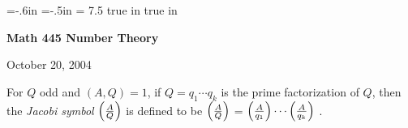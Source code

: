 \def\cmb{\MidnightBlue}	  %
\def\cnb{\NavyBlue}	  %
\def\crb{\RoyalBlue}	  %
\def\cce{\Cerulean}	  %
\def\ccy{\Cyan}		  %
\def\cpb{\ProcessBlue}	  %
\def\csb{\SkyBlue}	  %
\def\ctu{\Turquoise}	  %
\def\ctb{\TealBlue}	  %
\def\caq{\Aquamarine}	  %
\def\cbg{\BlueGreen}	  %
\def\cem{\Emerald}	  %
\def\cjg{\JungleGreen}	  %
\def\csg{\SeaGreen}	  %
\def\cgg{\Green}	  %
\def\cfg{\ForestGreen}	  %
\def\cpg{\PineGreen}	  %
\def\clg{\LimeGreen}	  %
\def\cyg{\YellowGreen}	  %
\def\cspg{\SpringGreen}	  %
\def\cog{\OliveGreen}	  %
\def\pars{\RawSienna}	  %
\def\cse{\Sepia}		  %
\def\cbr{\Brown}		  %
\def\cta{\Tan}		  %
\def\cgr{\Gray}		  %
\def\cbl{\Black}		  %
\def\cwh{\White}		  %


\voffset=-.6in
\hoffset=-.5in
\hsize = 7.5 true in
 true in


\overfullrule=0pt


\def\ctln{\centerline}
\def\u{\underbar}
\def\ssk{\smallskip}
\def\msk{\medskip}
\def\bsk{\bigskip}
\def\hsk{\hskip.1in}
\def\hhsk{\hskip.2in}

\def\lra{$\Leftrightarrow$ }


\ctln{\bf Math 445 Number Theory}

\smallskip

\ctln{October 20, 2004}

\medskip

For $Q$ odd and $(A,Q)=1$, if $Q=q_1\cdots q_k$ is the prime factorization of $Q$, then the {\it Jacobi symbol}
$\Big({{A}\over{Q}}\Big)$ is defined to be 
$\Big({{A}\over{Q}}\Big)$ = $\Big({{A}\over{q_1}}\Big)\cdots\Big({{A}\over{q_k}}\Big)$ .

